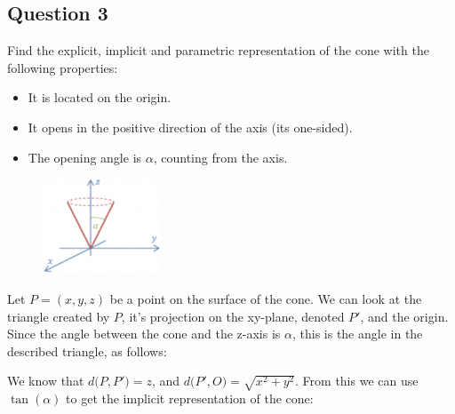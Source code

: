 \documentclass{article}
\begin{document}
    \newpage
    \subsection*{Question 3}
    \begin{framed}
        Find the explicit, implicit and parametric representation of the cone with the following properties:
        \begin{itemize}
            \item It is located on the origin.
            \item It opens in the positive direction of the axis (its one-sided).
            \item The opening angle is $\alpha$, counting from the axis.
        \end{itemize}
        \begin{figure}[H]
            \centering
            \includegraphics[width=3.5cm]{q3.png}
        \end{figure}
    \end{framed}
    Let $P=(x,y,z)$ be a point on the surface of the cone. We can look at the triangle created by $P$, it's projection on the xy-plane, denoted $P'$, and the origin. Since the angle between the cone and the z-axis is $\alpha$, this is the angle in the described triangle, as follows:
    \begin{figure}[H]
        \centering
    \end{figure}
    \noindent
    We know that $d\big(P,P'\big) = z$, and $d\big(P',O\big) = \sqrt{x^2+y^2}$. From this we can use $\tan(\alpha)$ to get the implicit representation of the cone:
\end{document}
